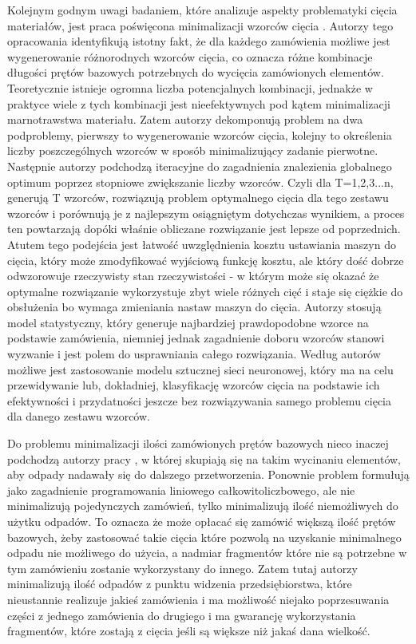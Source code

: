 Kolejnym godnym uwagi badaniem, które analizuje aspekty problematyki cięcia materiałów, jest praca poświęcona minimalizacji wzorców cięcia \cite{patterns-reduction}. Autorzy tego opracowania identyfikują istotny fakt, że dla każdego zamówienia możliwe jest wygenerowanie różnorodnych wzorców cięcia, co oznacza różne kombinacje długości prętów bazowych potrzebnych do wycięcia zamówionych elementów. Teoretycznie istnieje ogromna liczba potencjalnych kombinacji, jednakże w praktyce wiele z tych kombinacji jest nieefektywnych pod kątem minimalizacji marnotrawstwa materiału. Zatem autorzy dekomponują problem na dwa podproblemy, pierwszy to wygenerowanie wzorców cięcia, kolejny to określenia liczby poszczególnych wzorców w sposób minimalizujący zadanie pierwotne. Następnie autorzy podchodzą iteracyjne do zagadnienia znalezienia globalnego optimum poprzez stopniowe zwiększanie liczby wzorców. Czyli dla T=1,2,3...n, generują T wzorców, rozwiązują problem optymalnego cięcia dla tego zestawu wzorców i porównują je z najlepszym osiągniętym dotychczas wynikiem, a proces ten powtarzają dopóki właśnie obliczane rozwiązanie jest lepsze od poprzednich. Atutem tego podejścia jest łatwość uwzględnienia kosztu ustawiania maszyn do cięcia, który może zmodyfikować wyjściową funkcję kosztu, ale który dość dobrze odwzorowuje rzeczywisty stan rzeczywistości - w którym może się okazać że optymalne rozwiązanie wykorzystuje zbyt wiele różnych cięć i staje się ciężkie do obsłużenia bo wymaga zmieniania nastaw maszyn do cięcia. Autorzy stosują model statystyczny, który generuje najbardziej prawdopodobne wzorce na podstawie zamówienia, niemniej jednak zagadnienie doboru wzorców stanowi wyzwanie i jest polem do usprawniania całego rozwiązania. Według autorów możliwe jest zastosowanie modelu sztucznej sieci neuronowej, który ma na celu przewidywanie lub, dokładniej, klasyfikację wzorców cięcia na podstawie ich efektywności i przydatności jeszcze bez rozwiązywania samego problemu cięcia dla danego zestawu wzorców. 

Do problemu minimalizacji ilości zamówionych prętów bazowych nieco inaczej podchodzą autorzy pracy \cite{structural-tubes}, w której skupiają się na takim wycinaniu elementów, aby odpady nadawały się do dalszego przetworzenia. Ponownie problem formułują jako zagadnienie programowania liniowego całkowitoliczbowego, ale nie minimalizują pojedynczych zamówień, tylko minimalizują ilość niemożliwych do użytku odpadów. To oznacza że może opłacać się zamówić większą ilość prętów bazowych, żeby zastosować takie cięcia które pozwolą na uzyskanie minimalnego odpadu nie możliwego do użycia, a nadmiar fragmentów które nie są potrzebne w tym zamówieniu zostanie wykorzystany do innego. Zatem tutaj autorzy minimalizują ilość odpadów z punktu widzenia przedsiębiorstwa, które nieustannie realizuje jakieś zamówienia i ma możliwość niejako poprzesuwania części z jednego zamówienia do drugiego i ma gwarancję wykorzystania fragmentów, które zostają z cięcia jeśli są większe niż jakaś dana wielkość.


